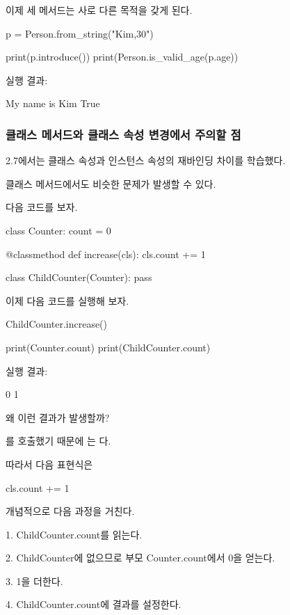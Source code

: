 이제 세 메서드는 사로 다른 목적을 갖게 된다.

\begin{dhkcode}
p = Person.from_string("Kim,30")

print(p.introduce())
print(Person.is_valid_age(p.age))
\end{dhkcode}

실행 결과:

\begin{dhkzsh}
My name is Kim
True
\end{dhkzsh}

\subsubsection{클래스 메서드와 클래스 속성 변경에서 주의할 점}

2.7에서는 클래스 속성과 인스턴스 속성의 재바인딩 차이를 학습했다.

클래스 메서드에서도 비슷한 문제가 발생할 수 있다.

다음 코드를 보자.

\begin{dhkcode}
class Counter:
    count = 0

    @classmethod
    def increase(cls):
        cls.count += 1

class ChildCounter(Counter):
    pass
\end{dhkcode}

이제 다음 코드를 실행해 보자.

\begin{dhkcode}
ChildCounter.increase()

print(Counter.count)
print(ChildCounter.count)
\end{dhkcode}

실행 결과:

\begin{dhkzsh}
0
1
\end{dhkzsh}

왜 이런 결과가 발생할까?

를 호출했기 때문에 는 다.

따라서 다음 표현식은

\begin{dhkcode}
cls.count += 1
\end{dhkcode}

개념적으로 다음 과정을 거친다.

\begin{dhksmry}
    1. ChildCounter.count를 읽는다.

    2. ChildCounter에 없으므로
        부모 Counter.count에서 0을 얻는다.

    3. 1을 더한다.

    4. ChildCounter.count에 결과를 설정한다.
\end{dhksmry}

